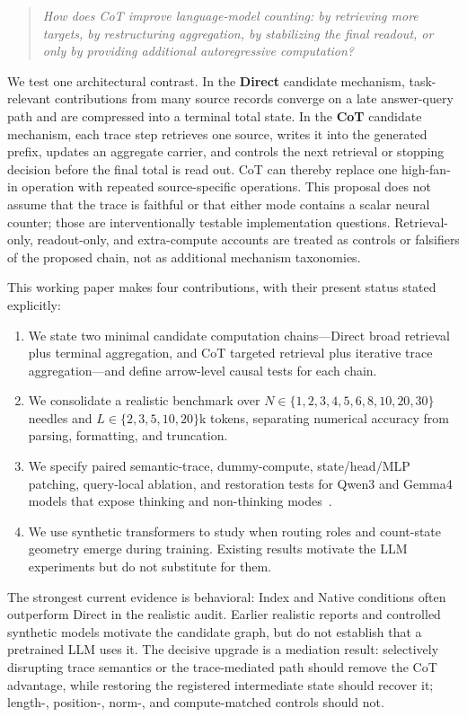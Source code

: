 \documentclass[11pt]{article}
\begin{document}
\begin{quote}
\emph{How does CoT improve language-model counting: by retrieving more targets, by restructuring aggregation, by stabilizing the final readout, or only by providing additional autoregressive computation?}
\end{quote}

We test one architectural contrast. In the \textbf{Direct} candidate mechanism, task-relevant contributions from many source records converge on a late answer-query path and are compressed into a terminal total state. In the \textbf{CoT} candidate mechanism, each trace step retrieves one source, writes it into the generated prefix, updates an aggregate carrier, and controls the next retrieval or stopping decision before the final total is read out. CoT can thereby replace one high-fan-in operation with repeated source-specific operations. This proposal does not assume that the trace is faithful or that either mode contains a scalar neural counter; those are interventionally testable implementation questions. Retrieval-only, readout-only, and extra-compute accounts are treated as controls or falsifiers of the proposed chain, not as additional mechanism taxonomies.

This working paper makes four contributions, with their present status stated explicitly:

\begin{enumerate}
  \item We state two minimal candidate computation chains---Direct broad retrieval plus terminal aggregation, and CoT targeted retrieval plus iterative trace aggregation---and define arrow-level causal tests for each chain.
  \item We consolidate a realistic benchmark over $N\in\{1,2,3,4,5,6,8,10,20,30\}$ needles and $L\in\{2,3,5,10,20\}$k tokens, separating numerical accuracy from parsing, formatting, and truncation.
  \item We specify paired semantic-trace, dummy-compute, state/head/MLP patching, query-local ablation, and restoration tests for Qwen3 and Gemma4 models that expose thinking and non-thinking modes~\citep{yang2025qwen3,gemmateam2026gemma4}.
  \item We use synthetic transformers to study when routing roles and count-state geometry emerge during training. Existing results motivate the LLM experiments but do not substitute for them.
\end{enumerate}

The strongest current evidence is behavioral: Index and Native conditions often outperform Direct in the realistic audit. Earlier realistic reports and controlled synthetic models motivate the candidate graph, but do not establish that a pretrained LLM uses it. The decisive upgrade is a mediation result: selectively disrupting trace semantics or the trace-mediated path should remove the CoT advantage, while restoring the registered intermediate state should recover it; length-, position-, norm-, and compute-matched controls should not.
\end{document}
